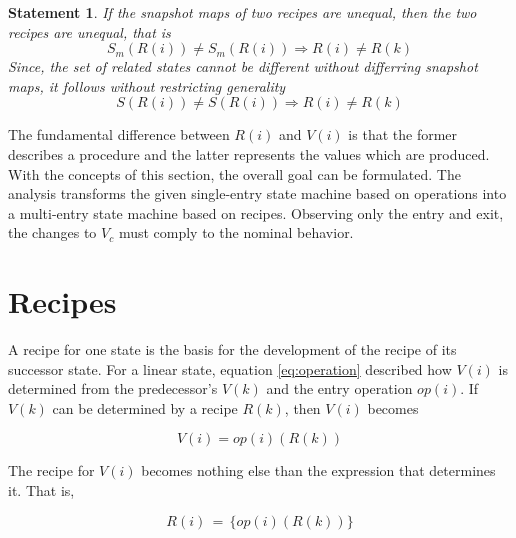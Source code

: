 \documentclass[12pt,a4paper]{scrartcl}
\newtheorem{statement}{Statement}
\begin{document}
\begin{statement}
   If the snapshot maps of two recipes are unequal, then the two recipes
   are unequal, that is
   \begin{equation} \label{eq:snapshot-map-difference}
       S_m(R(i)) \neq S_m(R(i)) \Rightarrow R(i) \neq R(k)
   \end{equation}
   Since, the set of related states cannot be different without differring 
   snapshot maps, it follows without restricting generality
   \begin{equation} \label{eq:snapshot-map-difference2}
       S(R(i)) \neq S(R(i)) \Rightarrow R(i) \neq R(k)
   \end{equation}
\end{statement}

The fundamental difference between $R(i)$ and $V(i)$ is that the former
describes a procedure and the latter represents the values which are produced.
With the concepts of this section, the overall goal can be formulated. The
analysis transforms the given single-entry state machine based on operations
into a multi-entry state machine based on recipes. Observing only the entry and
exit, the changes to $V_c$ must comply to the nominal behavior. 

%
\section{Recipes}

A recipe for one state is the basis for the development of the recipe of its
successor state. For a linear state, equation \eqref{eq:operation} described
how $V(i)$ is determined from the predecessor's $V(k)$ and the entry operation
$op(i)$. If $V(k)$ can be determined by a recipe $R(k)$, then $V(i)$ becomes

\begin{equation} \label{eq:accumulation2}
                     V(i) = op(i)(R(k))                                     
\end{equation}

The recipe for $V(i)$ becomes nothing else than the expression that determines
it. That is,

\begin{equation} \label{eq:accumulation3}
                     R(i)\,=\,\{ op(i)(R(k)) \}                                 
\end{equation}
                 
\end{document}
